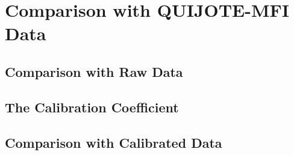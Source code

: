 \chapter{Comparison with QUIJOTE-MFI Data}

\section{Comparison with Raw Data}

\section{The Calibration Coefficient}

\section{Comparison with Calibrated Data}
